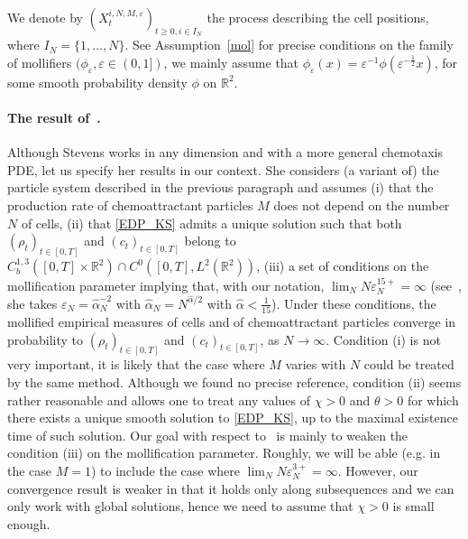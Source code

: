 \documentclass[11pt]{article}
\newcommand{\R}{\mathbb{R}}
\newcommand{\1}{\mathbbm{1}}
\newcommand{\e}{\varepsilon}
\newcommand{\vip}{\vskip5pt}
\begin{document}
\vip

We denote by $(X^{i,N,M,\e}_t)_{t\geq 0, i \in I_N}$ the process 
describing the cell positions, where $I_N=\{1,\dots,N\}$.
See Assumption~\ref{mol} for precise conditions on the family of mollifiers $(\phi_\e, \e\in (0,1])$, we mainly assume that $\phi_\e(x)=\e^{-1}\phi(\e^{-\frac12}x)$, for some smooth probability density $\phi$ on $\R^2$.

 
\paragraph{The result of~\cite{Stevens}.}
 Although Stevens works in any dimension and with a more general chemotaxis PDE, let us specify her results in our context. She considers (a variant of) the particle system described in the previous paragraph and assumes (i) that the production rate of chemoattractant particles 
$M$ does not depend on the number $N$ of cells, 
(ii) that \eqref{EDP_KS} admits a unique solution such that both $(\rho_t)_{t\in[0,T]}$ and $(c_t)_{t\in[0,T]}$ belong to $C_b^{1,3}([0,T]\times \R^2)\cap C^0([0,T], L^2(\R^2))$, 
(iii) a set of conditions on the mollification parameter implying that, with our notation, 
$\lim_N N \e_N^{15+}=\infty$ (see~\cite[Sections~2 and~3]{Stevens}, she takes $\e_N=\hat \alpha_N^{-2}$ 
with $\hat \alpha_N=N^{\hat \alpha/2}$ with $\hat\alpha<\frac1{15}$).
Under these conditions, the mollified empirical measures of cells and of chemoattractant particles converge in probability to $(\rho_t)_{t\in [0,T]}$ and $(c_t)_{t\in [0,T]}$, as $N\to \infty$.
\vip
Condition (i) is not very important, it is likely that the case where $M$ varies with $N$ could be treated by the same method. Although we found no precise reference, condition (ii) seems rather reasonable and allows one to treat any values of $\chi>0$ and $\theta>0$ for which  there exists a unique
smooth solution to \eqref{EDP_KS}, up to the maximal existence time of such solution.
\vip
Our goal with respect to~\cite{Stevens} is mainly to weaken the condition (iii) on the mollification parameter. Roughly, we will be able (e.g. in the case $M=1$) to include the case where $\lim_N N \e_N^{3+}=\infty$. 
However, our convergence result is weaker in that it holds only along subsequences and we can only work with global solutions, hence we need to assume that $\chi>0$ is small enough.
\end{document}
